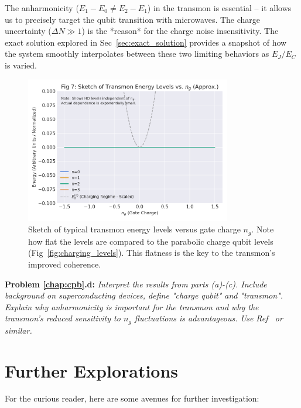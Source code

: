 \documentclass{book}
\newenvironment{problem}[1][Problem]{\par\medskip\noindent\textbf{#1:}\em}{\par\medskip}
\begin{document}
The anharmonicity (\(E_1-E_0 \neq E_2-E_1\)) in the transmon is essential – it allows us to precisely target the qubit transition with microwaves. The charge uncertainty (\(\Delta N \gg 1\)) is the *reason* for the charge noise insensitivity. The exact solution explored in Sec~\ref{sec:exact_solution} provides a snapshot of how the system smoothly interpolates between these two limiting behaviors as \(E_J/E_C\) is varied.

\begin{figure}[h]
    \centering
    \includegraphics[width=0.8\textwidth]{fig_transmon_levels.png}
    \caption[Transmon energy levels vs. gate charge]{Sketch of typical transmon energy levels versus gate charge \(n_g\). Note how flat the levels are compared to the parabolic charge qubit levels (Fig~\ref{fig:charging_levels}). This flatness is the key to the transmon's improved coherence.}
    \label{fig:transmon_levels}
\end{figure}

\begin{problem}[Problem \ref{chap:cpb}.d] 
Interpret the results from parts (a)-(c). Include background on superconducting devices, define "charge qubit" and "transmon". Explain why anharmonicity is important for the transmon and why the transmon's reduced sensitivity to \(n_g\) fluctuations is advantageous. Use Ref~\cite{Kjaergaard2020} or similar.
\end{problem}


\section{Further Explorations}
\label{sec:further_problems}

For the curious reader, here are some avenues for further investigation:
\end{document}
